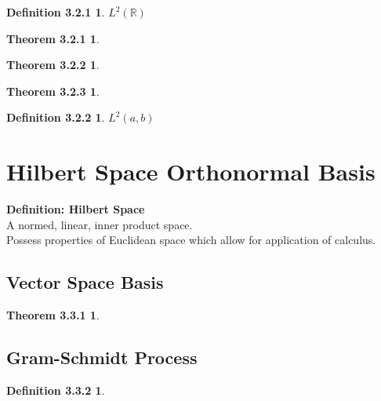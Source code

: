 \documentclass{article}
\theoremstyle{plain}
\newtheorem*{definition321*}{Definition 3.2.1}
\newtheorem*{definition322*}{Definition 3.2.2}
\newtheorem*{theorem321*}{Theorem 3.2.1}
\newtheorem*{theorem322*}{Theorem 3.2.2}
\newtheorem*{theorem323*}{Theorem 3.2.3}
\newtheorem*{definition332*}{Definition 3.3.2}
\newtheorem*{theorem331*}{Theorem 3.3.1}
\begin{document}
\begin{definition321*}  $L^{2}\left(\mathbb{R}\right)$ 
\end{definition321*}


\begin{theorem321*} 
\end{theorem321*}

\begin{theorem322*} 
\end{theorem322*}

\begin{theorem323*} 
\end{theorem323*}

\begin{definition322*}  $L^{2}\left(a,b\right)$  \\
\end{definition322*}

\section*{Hilbert Space Orthonormal Basis}

\textbf{Definition: Hilbert Space} \\
A normed, linear, inner product space. \\
Possess properties of Euclidean space which allow for application of calculus.

\subsection*{Vector Space Basis}

\begin{theorem331*} 
\end{theorem331*}

\subsection*{Gram-Schmidt Process}


\begin{definition332*} 
\end{definition332*}
\end{document}
